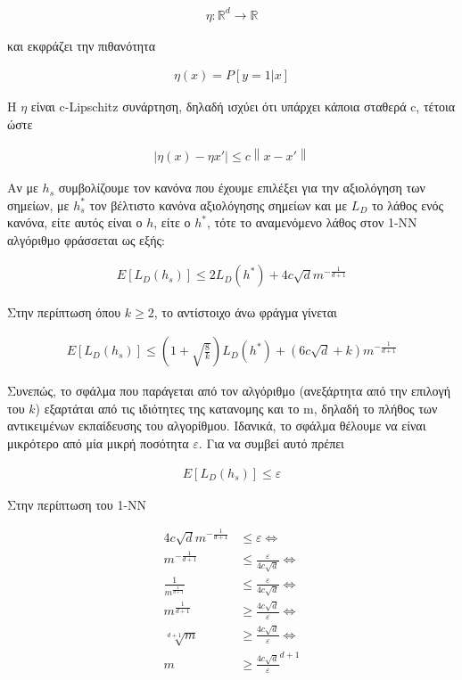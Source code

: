 \documentclass[12pt]{article}
\newcommand{\R}{\mathbb{R}}
\newcommand{\norm}[1]{\left\lVert#1\right\rVert}
\begin{document}
\begin{align*}
	η: \R^d \rightarrow \R
\end{align*}

και εκφράζει την πιθανότητα 

\begin{align*}
	η(x) = P[y = 1 | x]
\end{align*}

Η \(η\) είναι c-Lipschitz συνάρτηση, δηλαδή ισχύει ότι υπάρχει κάποια σταθερά c, τέτοια ώστε

\begin{align*}
	|η(x) - η{x'}| \leq c \norm{x-x'}
\end{align*}  

Αν με \(h_s\) συμβολίζουμε τον κανόνα που έχουμε επιλέξει για την αξιολόγηση των σημείων, με \(h_{s}^*\) τον βέλτιστο κανόνα αξιολόγησης σημείων και με \(L_D\) το λάθος ενός κανόνα, είτε αυτός είναι ο \(h\), είτε ο \(h^*\), τότε το αναμενόμενο λάθος στον 1-NN αλγόριθμο φράσσεται ως εξής:

\begin{align*}
	E[L_D(h_s)] \leq 2 L_D(h^*) + 4c \sqrt{d} m^{- \frac{1}{d+1}}
\end{align*} 

Στην περίπτωση όπου \(k \geq 2\), το αντίστοιχο άνω φράγμα γίνεται 

\begin{align*}
	E[L_D(h_s)] \leq (1 + \sqrt{\frac{8}{k}}) L_D(h^*) + (6c \sqrt{d} + k) m^{- \frac{1}{d+1}}
\end{align*} 

Συνεπώς, το σφάλμα που παράγεται από τον αλγόριθμο (ανεξάρτητα από την επιλογή του \(k\)) εξαρτάται από τις ιδιότητες της κατανομης και το m, δηλαδή το πλήθος των αντικειμένων εκπαίδευσης του αλγορίθμου. Ιδανικά, το σφάλμα θέλουμε να είναι μικρότερο από μία μικρή ποσότητα \(ε\). Για να συμβεί αυτό πρέπει

\begin{align*}
	E[L_D(h_s)] \leq ε
\end{align*}

Στην περίπτωση του 1-ΝΝ

\begin{align*}
	4c \sqrt{d} m^{- \frac{1}{d+1}} &\leq ε \Leftrightarrow \\
	m^{- \frac{1}{d+1}} &\leq \frac{ε}{4c \sqrt{d}} \Leftrightarrow \\
	\frac{1}{m^{\frac{1}{d+1}}} &\leq \frac{ε}{4c \sqrt{d}} \Leftrightarrow \\
	m^{\frac{1}{d+1}} &\geq \frac{4c \sqrt{d} }{ε}\Leftrightarrow \\
	\sqrt[d+1]{m} &\geq \frac{4c \sqrt{d} }{ε} \Leftrightarrow \\
	m &\geq \frac{4c \sqrt{d}}{ε}^{d+1} 
\end{align*}
\end{document}
